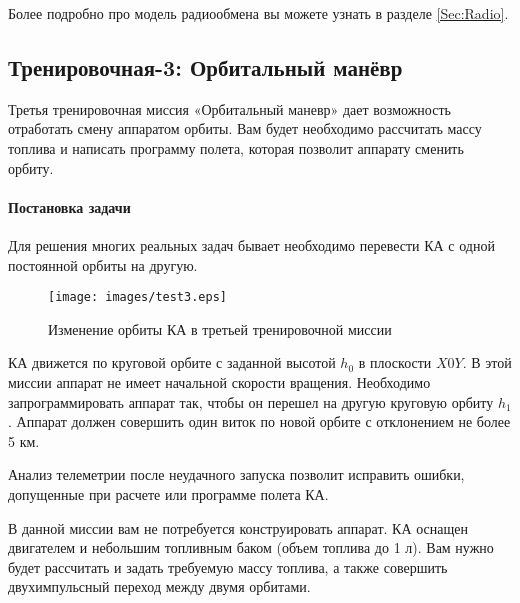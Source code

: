 \documentclass[12pt,a4paper]{article}
\begin{document}
Более подробно про модель радиообмена вы можете узнать в разделе \ref{Sec:Radio}.

\clearpage
\subsection{Тренировочная-3: Орбитальный манёвр}

Третья тренировочная миссия «Орбитальный маневр» дает возможность отработать смену
аппаратом орбиты. Вам будет необходимо рассчитать массу топлива и написать программу
полета, которая позволит аппарату сменить орбиту.

\paragraph{Постановка задачи}

Для решения многих реальных задач бывает необходимо перевести КА с одной постоянной орбиты
на другую.

\begin{figure}[tbh]
  \begin{center}
    \texttt{[image: images/test3.eps]}
    \caption{Изменение орбиты КА в третьей тренировочной миссии}
    \label{Pic:Test-3}
  \end{center}
\end{figure}

КА движется по круговой орбите с заданной высотой $h_0$ в плоскости $X0Y$. В этой миссии
аппарат не имеет начальной скорости вращения. Необходимо запрограммировать аппарат так,
чтобы он перешел на другую круговую орбиту $h_1$. Аппарат должен совершить один виток по
новой орбите с отклонением не более 5 км.

Анализ телеметрии после неудачного запуска позволит исправить ошибки, допущенные при
расчете или программе полета КА.

В данной миссии вам не потребуется конструировать аппарат. КА оснащен двигателем и
небольшим топливным баком (объем топлива до 1 л). Вам нужно будет рассчитать и задать
требуемую массу топлива, а также совершить двухимпульсный переход между двумя орбитами.
\end{document}
